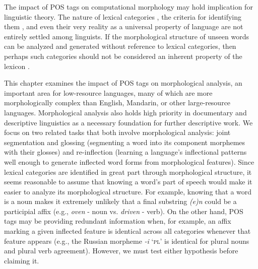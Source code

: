 The impact of POS tags on computational morphology may hold implication for linguistic theory. 
The nature of lexical categories \citep{rauh_syntactic_2010}, the criteria for identifying them  \citep{croft_parts_2000}, and even their very reality as a universal property of language \citep{gil_word_2005} are not entirely settled among linguists. 
If the morphological structure of unseen words can be analyzed and generated without reference to lexical categories, then perhaps such categories should not be considered an inherent property of the lexicon \citep{rauh_linguistic_2016}.

This chapter examines the impact of POS tags on morphological analysis, an important area for low-resource languages, many of which are more morphologically complex than English, Mandarin, or other large-resource languages. Morphological analysis also holds high priority in documentary and descriptive linguistics as a necessary foundation for further descriptive work. We focus on two related tasks that both involve morphological analysis: joint segmentation and glossing (segmenting a word into its component morphemes with their glosses) and re-inflection (learning a language's inflectional patterns well enough to generate inflected word forms from morphological features). Since lexical categories are identified in great part through morphological structure, it seems reasonable to assume that knowing a word's part of speech would make it easier to analyze its morphological structure. For example, knowing that a word is a noun makes it extremely unlikely that a final substring \textit{(e)n} could be a participial affix (e.g., \textit{oven} - noun vs. \textit{driven} - verb). On the other hand, POS tags may be providing redundant information when, for example, an affix marking a given inflected feature is identical across all categories whenever that feature appears (e.g., the Russian morpheme \textit{-i} `\textsc{pl}' is identical for plural nouns and plural verb agreement). However, we must test either hypothesis before claiming it.


